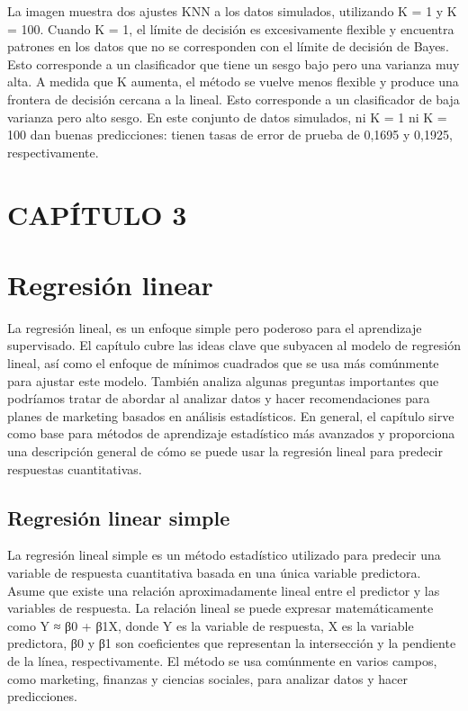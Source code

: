 \documentclass[
  letterpaper,
  DIV=11,
  numbers=noendperiod]{scrartcl}
\begin{document}
La imagen muestra dos ajustes KNN a los datos simulados, utilizando K =
1 y K = 100. Cuando K = 1, el límite de decisión es excesivamente
flexible y encuentra patrones en los datos que no se corresponden con el
límite de decisión de Bayes. Esto corresponde a un clasificador que
tiene un sesgo bajo pero una varianza muy alta. A medida que K aumenta,
el método se vuelve menos flexible y produce una frontera de decisión
cercana a la lineal. Esto corresponde a un clasificador de baja varianza
pero alto sesgo. En este conjunto de datos simulados, ni K = 1 ni K =
100 dan buenas predicciones: tienen tasas de error de prueba de 0,1695 y
0,1925, respectivamente.

\hypertarget{capuxedtulo-3}{%
\section{CAPÍTULO 3}\label{capuxedtulo-3}}

\hypertarget{regresiuxf3n-linear}{%
\section{Regresión linear}\label{regresiuxf3n-linear}}

La regresión lineal, es un enfoque simple pero poderoso para el
aprendizaje supervisado. El capítulo cubre las ideas clave que subyacen
al modelo de regresión lineal, así como el enfoque de mínimos cuadrados
que se usa más comúnmente para ajustar este modelo. También analiza
algunas preguntas importantes que podríamos tratar de abordar al
analizar datos y hacer recomendaciones para planes de marketing basados
en análisis estadísticos. En general, el capítulo sirve como base para
métodos de aprendizaje estadístico más avanzados y proporciona una
descripción general de cómo se puede usar la regresión lineal para
predecir respuestas cuantitativas.

\hypertarget{regresiuxf3n-linear-simple}{%
\subsection{Regresión linear simple}\label{regresiuxf3n-linear-simple}}

La regresión lineal simple es un método estadístico utilizado para
predecir una variable de respuesta cuantitativa basada en una única
variable predictora. Asume que existe una relación aproximadamente
lineal entre el predictor y las variables de respuesta. La relación
lineal se puede expresar matemáticamente como Y ≈ β0 + β1X, donde Y es
la variable de respuesta, X es la variable predictora, β0 y β1 son
coeficientes que representan la intersección y la pendiente de la línea,
respectivamente. El método se usa comúnmente en varios campos, como
marketing, finanzas y ciencias sociales, para analizar datos y hacer
predicciones.
\end{document}
